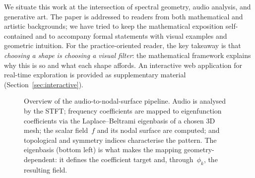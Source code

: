 \documentclass[]{interact}
\theoremstyle{plain}
\theoremstyle{definition}
\theoremstyle{remark}
\begin{document}
We situate this work at the intersection of spectral geometry, audio analysis, and generative art. The paper is addressed to readers from both mathematical and artistic backgrounds; we have tried to keep the mathematical exposition self-contained and to accompany formal statements with visual examples and geometric intuition. For the practice-oriented reader, the key takeaway is that \emph{choosing a shape is choosing a visual filter}: the mathematical framework explains why this is so and what each shape affords. An interactive web application for real-time exploration is provided as supplementary material (Section~\ref{sec:interactive}).

\begin{figure}[!htbp]
\centering
{}
\caption{Overview of the audio-to-nodal-surface pipeline. Audio is analysed by the STFT; frequency coefficients are mapped to eigenfunction coefficients via the Laplace--Beltrami eigenbasis of a chosen 3D mesh; the scalar field~$f$ and its nodal surface are computed; and topological and symmetry indices characterise the pattern. The eigenbasis (bottom left) is what makes the mapping geometry-dependent: it defines the coefficient target and, through~$\phi_k$, the resulting field.}
\label{fig:pipeline}
\end{figure}
\end{document}
